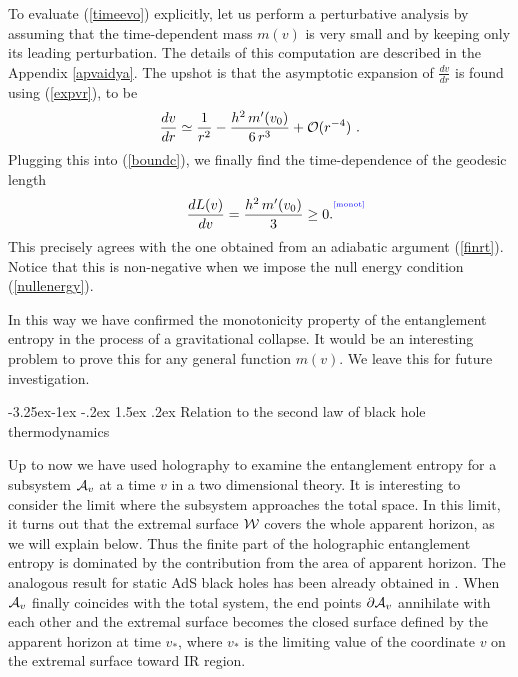 \documentclass[12pt]{article}
\makeatletter
\renewcommand\subsection{\@startsection{subsection}{2}{\z@}%
                                     {-3.25ex\@plus -1ex \@minus -.2ex}%
                                     {1.5ex \@plus .2ex}%
                                     {\normalfont\bfseries}}
\newcommand{\be}{\begin{equation}}
\newcommand{\ee}{\end{equation}}
\def\req#1{(\ref{#1})}
\def\App#1{Appendix \ref{#1}}
\def\CA{{\cal A}}
\def\CO{{\cal O}}
\def\CW{{\cal W}}
\def\f#1#2{{\frac{#1}{#2}}}
\def\f#1#2{{\frac{#1}{#2}}}
\def\Label#1{\label{#1}%
{ \color{blue}{\smash{\hbox to0pt{\raise2ex\hbox{\tiny[#1]}\hss}}}}}
\def\Gms{\CW}
\def\rA{\CA}
\def\de{\partial}
\def\f {\frac}
\makeatother
\begin{document}
To evaluate \req{timeevo} explicitly, let us perform a perturbative
analysis by assuming that the time-dependent mass $m(v)$ is very
small and by keeping only its leading perturbation. The details of
this computation are described in the \App{apvaidya}. The
upshot is that the asymptotic expansion of $\f{dv}{dr}$ is found using (\ref{expvr}),
to be
%
\be \f{dv}{dr}\simeq
\f{1}{r^2}-\f{h^2 \, m'(v_0)}{6\,r^3}+\CO(r^{-4}) \ . \ee
%
Plugging this into \req{boundc}, we finally find the time-dependence of the
geodesic length
%
\be \f{dL(v)}{dv}=\f{h^2 \, m'(v_0)}{3}\geq
0.\Label{monot}\ee
%
This precisely agrees with the one obtained from
an adiabatic argument \req{finrt}. Notice that this is non-negative
when we impose the null energy condition \req{nullenergy}.

In this way we have confirmed the monotonicity property of the
entanglement entropy in the process of a gravitational collapse. It
would be an interesting problem to prove this for any general
function $m(v)$. We leave this for future investigation.


\subsection{Relation to the second law of black hole thermodynamics}
\label{totent}

Up to now we have used holography to examine the entanglement
entropy for a subsystem $\rA_v$ at a time $v$ in a two dimensional
theory. It is interesting to consider the limit where the subsystem
approaches the total space. In this limit,  it turns out that the
extremal surface $\Gms$ covers the whole apparent horizon, as we
will explain below. Thus the finite part of the holographic
entanglement entropy is dominated by the contribution from the area
of apparent horizon. The analogous result for static AdS black holes
has been already obtained in \cite{Ryu:2006bv, Ryu:2006ef}. When
$\rA_v$ finally coincides with the total system, the end points $\de
\rA_v$ annihilate with each other and the extremal surface becomes
the closed surface defined by the apparent horizon at time $v_*$,
where $v_*$ is the limiting value of the coordinate $v$ on the
extremal surface toward IR region. 
\end{document}
